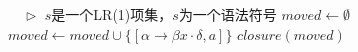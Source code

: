 \documentclass[varwidth=\maxdimen]{standalone}
\newcommand{\LeftComment}[1]{$\quad\triangleright$ #1}
\begin{document}
\begin{algorithmic}[1] %
    \LeftComment{$s$是一个LR(1)项集，$s$为一个语法符号}
    \State $moved \gets \emptyset$
        \State $moved \gets moved\cup\{[\alpha\to\beta x\cdot\delta,a]\}$
      \EndIf
    \EndFor
    \StateReturn $closure(moved)$
  \EndFunction
\end{algorithmic}
\end{document}
